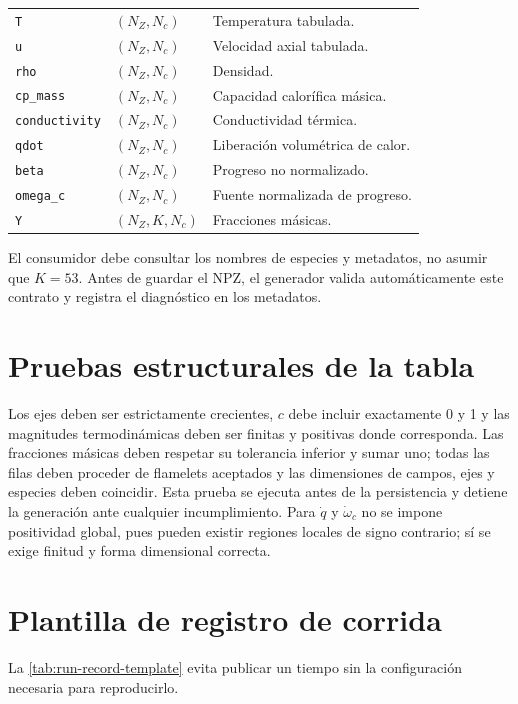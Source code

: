 \documentclass[12pt,a4paper,twoside,openany]{book}
\newcommand{\codigo}[1]{\texttt{#1}}
\begin{document}
\begin{longtable}{@{}p{}p{}p{}@{}}
\codigo{T} & \((N_Z,N_c)\) & Temperatura tabulada. \\
\codigo{u} & \((N_Z,N_c)\) & Velocidad axial tabulada. \\
\codigo{rho} & \((N_Z,N_c)\) & Densidad. \\
\codigo{cp\_mass} & \((N_Z,N_c)\) & Capacidad calorífica másica. \\
\codigo{conductivity} & \((N_Z,N_c)\) & Conductividad térmica. \\
\codigo{qdot} & \((N_Z,N_c)\) & Liberación volumétrica de calor. \\
\codigo{beta} & \((N_Z,N_c)\) & Progreso no normalizado. \\
\codigo{omega\_c} & \((N_Z,N_c)\) & Fuente normalizada de progreso. \\
\codigo{Y} & \((N_Z,K,N_c)\) & Fracciones másicas. \\
\bottomrule
\end{longtable}

El consumidor debe consultar los nombres de especies y metadatos, no asumir que
\(K=53\). Antes de guardar el NPZ, el generador valida automáticamente este
contrato y registra el diagnóstico en los metadatos.

\section{Pruebas estructurales de la tabla}

Los ejes deben ser estrictamente crecientes, \(c\) debe incluir exactamente 0 y
1 y las magnitudes termodinámicas deben ser finitas y positivas donde
corresponda. Las fracciones másicas deben respetar su tolerancia inferior y sumar
uno; todas las filas deben proceder de flamelets aceptados y las dimensiones de
campos, ejes y especies deben coincidir. Esta prueba se ejecuta antes de la
persistencia y detiene la generación ante cualquier incumplimiento. Para
\(\dot q\) y \(\dot\omega_c\) no se impone positividad global, pues pueden
existir regiones locales de signo contrario; sí se exige finitud y forma
dimensional correcta.

\section{Plantilla de registro de corrida}

La \cref{tab:run-record-template} evita publicar un tiempo sin la configuración
necesaria para reproducirlo.
\end{document}
